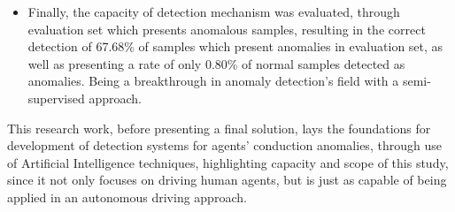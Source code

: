 \begin{itemize}
\item Finally, the capacity of detection mechanism was evaluated, through evaluation set which presents anomalous samples, resulting in the correct detection of 67.68\% of samples which present anomalies in evaluation set, as well as presenting a rate of only 0.80\% of normal samples detected as anomalies. Being a breakthrough in anomaly detection's field with a semi-supervised approach.
\end{itemize}

This research work, before presenting a final solution, lays the foundations for development of detection systems for agents' conduction anomalies, through  use of Artificial Intelligence techniques, highlighting capacity and scope of this study, since it not only focuses on driving human agents, but is just as capable of being applied in an autonomous driving approach.

